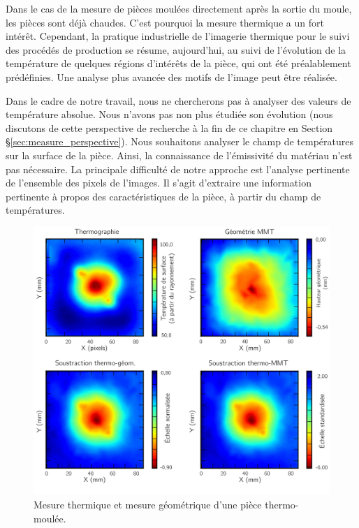 Dans le cas de la mesure de pièces moulées directement après la sortie du moule, les pièces sont déjà chaudes.
C'est pourquoi la mesure thermique a un fort intérêt.
Cependant, la pratique industrielle de l'imagerie thermique pour le suivi des procédés de production se résume, aujourd'hui, au suivi de l'évolution de la température de quelques régions d'intérêts de la pièce, qui ont été préalablement prédéfinies.
Une analyse plus avancée des motifs de l'image peut être réalisée.

Dans le cadre de notre travail, nous ne chercherons pas à analyser des valeurs de température absolue.
Nous n'avons pas non plus étudiée son évolution (nous discutons de cette perspective de recherche à la fin de ce chapitre en Section §\ref{sec:measure_perspective}).
Nous souhaitons analyser le champ de températures sur la surface de la pièce.
Ainsi, la connaissance de l'émissivité du matériau n'est pas nécessaire.
La principale difficulté de notre approche est l'analyse pertinente de l'ensemble des pixels de l'images.
Il s'agit d'extraire une information pertinente à propos des caractéristiques de la pièce, à partir du champ de températures.

\begin{figure}[tbp]
	\centering
	\includegraphics[width=\textwidth]{../Chap2/Figures/Comparaison_thermo_MMT.jpg}
	\caption{Mesure thermique et mesure géométrique d'une pièce thermo-moulée.}
	\label{fig:thermo_geom}
\end{figure}

